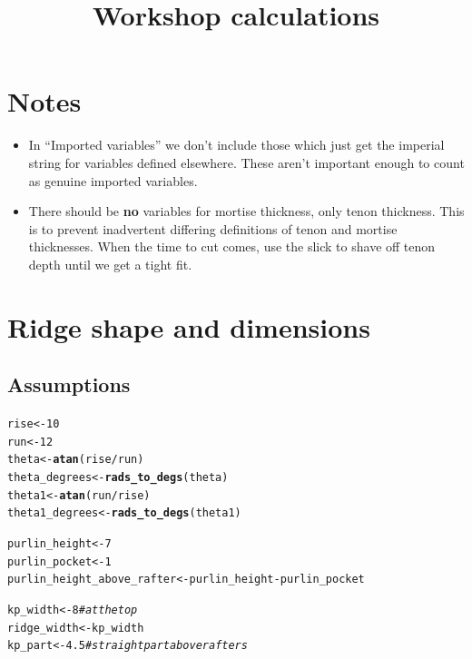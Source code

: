 \documentclass{article}\usepackage[]{graphicx}\usepackage[]{xcolor}
\title{Workshop calculations}
\makeatletter
\newcommand{\hlnum}[1]{\textcolor[rgb]{0.686,0.059,0.569}{#1}}%
\newcommand{\hlcom}[1]{\textcolor[rgb]{0.678,0.584,0.686}{\textit{#1}}}%
\newcommand{\hlopt}[1]{\textcolor[rgb]{0,0,0}{#1}}%
\newcommand{\hlstd}[1]{\textcolor[rgb]{0.345,0.345,0.345}{#1}}%
\newcommand{\hlkwb}[1]{\textcolor[rgb]{0.69,0.353,0.396}{#1}}%
\newcommand{\hlkwd}[1]{\textcolor[rgb]{0.737,0.353,0.396}{\textbf{#1}}}%
\newenvironment{kframe}{%
 \def\at@end@of@kframe{}%
 \ifinner\ifhmode%
  \def\at@end@of@kframe{\end{minipage}}%
  \begin{minipage}{\columnwidth}%
 \fi\fi%
 \def\FrameCommand##1{\hskip\@totalleftmargin \hskip-\fboxsep
 \colorbox{shadecolor}{##1}\hskip-\fboxsep
     \hskip-\linewidth \hskip-\@totalleftmargin \hskip\columnwidth}%
 \MakeFramed {\advance\hsize-\width
   \@totalleftmargin\z@ \linewidth\hsize
   \@setminipage}}%
 {\par\unskip\endMakeFramed%
 \at@end@of@kframe}
\newenvironment{knitrout}{}{} %
\makeatother
\begin{document}
\maketitle
\tableofcontents
 







\section*{Notes}

\begin{itemize}
  \item In ``Imported variables'' we don't include those which just get the imperial string for variables defined elsewhere. These aren't important enough to count as genuine imported variables. 
  \item There should be \textbf{no} variables for mortise thickness, only tenon thickness. This is to prevent inadvertent differing definitions of tenon and mortise thicknesses. When the time to cut comes, use the slick to shave off tenon depth until we get a tight fit. 
\end{itemize}




\section{Ridge shape and dimensions} \label{ridge-shape-and-dimensions}


\subsection{Assumptions} \label{ridge-shape-and-dimensions-assumptions}

\begin{knitrout}
\color{fgcolor}\begin{kframe}
\begin{alltt}
\hlstd{rise} \hlkwb{<-} \hlnum{10}
\hlstd{run} \hlkwb{<-} \hlnum{12}
\hlstd{theta} \hlkwb{<-} \hlkwd{atan}\hlstd{(rise}\hlopt{/}\hlstd{run)}
\hlstd{theta_degrees} \hlkwb{<-} \hlkwd{rads_to_degs}\hlstd{(theta)}
\hlstd{theta1} \hlkwb{<-} \hlkwd{atan}\hlstd{(run}\hlopt{/}\hlstd{rise)}
\hlstd{theta1_degrees} \hlkwb{<-} \hlkwd{rads_to_degs}\hlstd{(theta1)}

\hlstd{purlin_height} \hlkwb{<-} \hlnum{7}
\hlstd{purlin_pocket} \hlkwb{<-} \hlnum{1}
\hlstd{purlin_height_above_rafter} \hlkwb{<-} \hlstd{purlin_height} \hlopt{-} \hlstd{purlin_pocket}

\hlstd{kp_width} \hlkwb{<-} \hlnum{8} \hlcom{# at the top}
\hlstd{ridge_width} \hlkwb{<-} \hlstd{kp_width}
\hlstd{kp_part} \hlkwb{<-} \hlnum{4.5} \hlcom{# straight part above rafters}
\end{alltt}
\end{kframe}
\end{knitrout}
\end{document}
